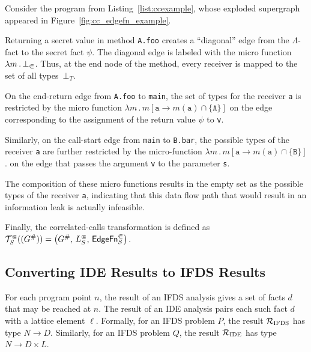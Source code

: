 \begin{example}
  Consider the program from Listing~\ref{list:ccexample}, whose exploded supergraph appeared in Figure~\ref{fig:cc_edgefn_example}.

  Returning a secret value in method \verb'A.foo' creates a ``diagonal'' edge from the $\Lambda$-fact to the secret fact $\psi$. 
  The diagonal edge is labeled with the micro function $\lambda m\,.\,\bot_\Subset$. Thus, at the end node of the method, every receiver is mapped to the set of all types~$\bot_T$.
  
On the end-return edge from \verb'A.foo' to \verb'main', the set of types for the receiver \verb'a' is restricted by the micro function $\lambda m\,.\,m[\texttt a\to m(\texttt a)\cap\{\texttt A\}]$ on the edge corresponding to the assignment of the return value $\psi$ to \verb'v'.

Similarly, on the call-start edge from \verb'main' to \verb'B.bar', the possible types
of the receiver \verb'a' are further restricted by the micro-function
$\lambda m\,.\,m[\texttt a\to m(\texttt a)\cap\{\texttt B\}]$.
on the edge that passes the argument \verb'v' to the parameter \verb's'.

The composition of these micro functions results in the empty set as the possible
types of the receiver \verb'a', indicating that this data flow path that would
result in an information leak is actually infeasible.
\end{example}


Finally, the correlated-calls transformation is defined as
    $\mathcal T^\Subset_S((G^\#))=\left(G^\#,\,L^\Subset_S,\,\textsf{EdgeFn}^\Subset_{S}\right)$.


\subsection{Converting IDE Results to IFDS Results}

For each program point $n$, the result of an IFDS analysis gives
a set of facts $d$ that may be reached at $n$. The result of an IDE analysis
pairs each such fact $d$ with a lattice element $\ell$. Formally,
for an IFDS problem $P$, the result $\mathcal R_{\text{IFDS}}$ has type
$N \to D$. Similarly, for an IFDS problem $Q$, the result $\mathcal R_{\text{IDE}}$
has type $N \to D \times L$.

